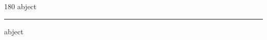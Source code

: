 
\begin{frame}
\begin{center}
\begin{turn}{180}
{\fontsize{2.5cm}{1em}\selectfont abject}
\end{turn}
\vspace{1em}\par  
\hrule
\vspace{1em}\par  
{\fontsize{2.5cm}{1em}\selectfont abject}
\end{center}
\end{frame}
